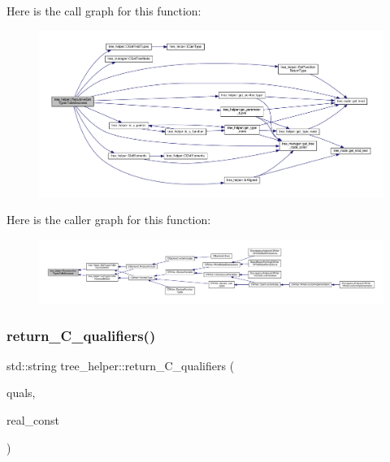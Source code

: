 Here is the call graph for this function\+:
\nopagebreak
\begin{figure}[H]
\begin{center}
\leavevmode
\includegraphics[width=350pt]{d7/d99/classtree__helper_a0f1604823bf63206a17b132f605b90ed_cgraph}
\end{center}
\end{figure}
Here is the caller graph for this function\+:
\nopagebreak
\begin{figure}[H]
\begin{center}
\leavevmode
\includegraphics[width=350pt]{d7/d99/classtree__helper_a0f1604823bf63206a17b132f605b90ed_icgraph}
\end{center}
\end{figure}
\mbox{\label{classtree__helper_a0835a1c7302f0915a8dae4b22549780d}} 
\subsubsection{\texorpdfstring{return\+\_\+\+C\+\_\+qualifiers()}{return\_C\_qualifiers()}}
{\footnotesize\ttfamily std\+::string tree\+\_\+helper\+::return\+\_\+\+C\+\_\+qualifiers (\begin{DoxyParamCaption}\item[{const \hyperlink{token__interface_8hpp_a14502d0757789149f644966ca931b126}{Tree\+Vocabulary\+Token\+Types\+\_\+\+Token\+Enum}}]{quals,  }\item[{bool}]{real\+\_\+const }\end{DoxyParamCaption})\hspace{0.3cm}{\ttfamily [static]}}




